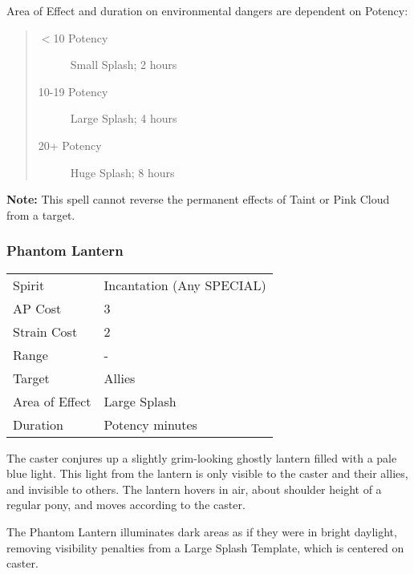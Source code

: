 \documentclass[11pt,a4paper,twocolumn]{book}
\begin{document}
Area of Effect and duration on environmental dangers are dependent on Potency:

\begin{quote}
	\begin{description}
		\item[$<$10 Potency] 	Small Splash; 2 hours
		\item[10-19 Potency] 	Large Splash; 4 hours
		\item[20+ Potency]  	Huge Splash; 8 hours
	\end{description}	
\end{quote}

\textbf{Note:} This spell cannot reverse the permanent effects of Taint or Pink Cloud from a target.

\subsubsection*{Phantom Lantern}
{
	\begin{tabu} to 75mm{| X[l,4] | X[l,7] |}
		\hline
		Spirit         & Incantation (Any SPECIAL) \\
		AP Cost        & 3                         \\
		Strain Cost    & 2                         \\
		Range          & -                         \\
		Target         & Allies                    \\
		Area of Effect & Large Splash              \\
		Duration       & Potency minutes           \\ \hline
	\end{tabu}
	
}

\medskip

The caster conjures up a slightly grim-looking ghostly lantern filled with a pale blue light. This light from the lantern is only visible to the caster and their allies, and invisible to others. The lantern hovers in air, about shoulder height of a regular pony, and moves according to the caster.

The Phantom Lantern illuminates dark areas as if they were in bright daylight, removing visibility penalties from a Large Splash Template, which is centered on caster.
\end{document}
